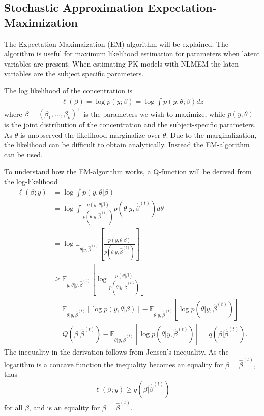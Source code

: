 \subsection{Stochastic Approximation Expectation-Maximization}
The Expectation-Maximaization (EM) algorithm will be explained. The algorithm is useful for maximum likelihood estimation for parameters when latent variables are present. When estimating PK models with NLMEM the laten variables are the subject specific parameters. 

The log likelihood of the concentration is
\begin{align*}
    \ell (\beta) = \log p(y;\beta) = \log \int p(y,\theta;\beta) dz
\end{align*}
where $\beta = (\beta_1, \dots, \beta_k)^{\top}$ is the parameters we wish to maximize, while $p(y,\theta)$ is the joint distribution of the concentration and the subject-specific parameters. As $\theta$ is unobserved the likelihood marginalize over $\theta$. Due to the marginalization, the likelihood can be difficult to obtain analytically. Instead the EM-algorithm can be used. 

To understand how the EM-algorithm works, a Q-function will be derived from the log-likelihood
\begin{align*}
    \ell (\beta; y) &= \log \int p(y,\theta | \beta)\\
    &= \log \int \frac{p(y,\theta|\beta)}{p(\theta|y,\hat{\beta}^{(t)})}p(\theta|y,\hat{\beta}^{(t)}) d\theta\\
    &=\log \mathbb{E}_{\theta| y, \hat{\beta}^{(t)}}\left[{\frac{p(y,\theta|\beta)}{p(\theta|y,\hat{\beta}^{(t)})}}\right]\\
    &\geq \mathbb{E}_{y,\theta| y, \hat{\beta}^{(t)}}\left[{\log\frac{p(\theta|\beta)}{p(\theta|y,\hat{\beta}^{(t)})}}\right] \\
    &=\mathbb{E}_{\theta| y, \hat{\beta}^{(t)}}\left[\log p(y,\theta| \beta) \right] - \mathbb{E}_{\theta| y, \hat{\beta}^{(t)}}\left[\log p(\theta| y, \hat{\beta}^{(t)}) \right]\\
    &= Q(\beta | \hat{\beta}^{(t)}) - \mathbb{E}_{\theta| y, \hat{\beta}^{(t)}}\left[\log p(\theta| y, \hat{\beta}^{(t)}) \right] = q(\beta | \hat{\beta}^{(t)}).
\end{align*}
The inequality in the derivation follows from Jensen's inequality. As the logarithm is a concave function the inequality becomes an equality for $\beta = \hat{\beta}^{(t)}$, thus
\begin{align*}
    \ell(\beta; y) \geq q(\beta| \hat{\beta}^{(t)})
\end{align*}
for all $\beta$, and is an equality for $\beta = \hat{\beta}^{(t)}$. 

